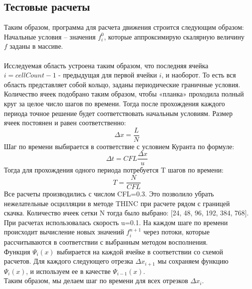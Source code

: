 \documentclass[12pt,a4paper]{article}
\begin{document}
\subsection{Тестовые расчеты}
Таким образом, программа для расчета движения строится следующим образом:\\
Начальные условия – значения $f_i^0$, которые аппроксимирую скалярную величину $f$ заданы в массиве.
\\
\medskip
\\
Исследуемая область устроена таким образом, что последняя ячейка $i=cellCount-1$ - предыдущая для первой ячейки $i$, и наоборот. То есть вся область представляет собой кольцо, заданы периодические граничные условия. Количество ячеек подобрано таким образом, чтобы «планка» проходила полный круг за целое число шагов по времени. Тогда после прохождения каждого периода точное решение будет соответствовать начальным условиям.
Размер ячеек постоянен и равен соответственно:
\[
\Delta x=\frac{L}{N}
\]
Шаг по времени выбирается в соответствие с условием Куранта по формуле: 
\[
\Delta t=CFL\frac{\Delta x}{u}
\]
Тогда для прохождения одного периода потребуется T шагов по времени:
\[
T=\frac{N}{CFL}
\]
Все расчеты производились с числом CFL=0.3. Это позволило убрать нежелательные осцилляции в методе THINC при расчете рядом с границей скачка. Количество ячеек сетки N тогда было выбрано: [24, 48, 96, 192, 384, 768]. При расчетах использовалась скорость u=0.1.
На каждом шаге по времени происходит вычисление новых значений $f_i^{n+1}$ через потоки, которые рассчитываются в соответствии с выбранным методом восполнения.\\
Функция $\Psi_i(x)$ выбирается на каждой ячейке в соответствии со схемой расчетов. Для каждого следующего отрезка $\Delta x_{i+1}$ мы сохраняем функцию $\Psi_i(x)$, и используем ее в качестве $\Psi_{i-1}(x)$.\\
Таким образом, мы делаем шаг по времени для всех отрезков $\Delta x_{i}$.
\end{document}
